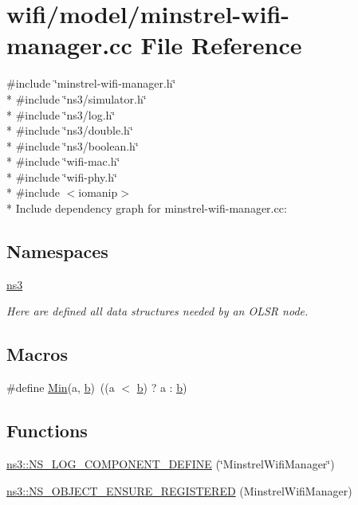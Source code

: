 \hypertarget{minstrel-wifi-manager_8cc}{}\section{wifi/model/minstrel-\/wifi-\/manager.cc File Reference}
\label{minstrel-wifi-manager_8cc}
{\ttfamily \#include \char`\"{}minstrel-\/wifi-\/manager.\+h\char`\"{}}\\*
{\ttfamily \#include \char`\"{}ns3/simulator.\+h\char`\"{}}\\*
{\ttfamily \#include \char`\"{}ns3/log.\+h\char`\"{}}\\*
{\ttfamily \#include \char`\"{}ns3/double.\+h\char`\"{}}\\*
{\ttfamily \#include \char`\"{}ns3/boolean.\+h\char`\"{}}\\*
{\ttfamily \#include \char`\"{}wifi-\/mac.\+h\char`\"{}}\\*
{\ttfamily \#include \char`\"{}wifi-\/phy.\+h\char`\"{}}\\*
{\ttfamily \#include $<$iomanip$>$}\\*
Include dependency graph for minstrel-\/wifi-\/manager.cc\+:
\subsection*{Namespaces}
\begin{DoxyCompactItemize}
\item 
 \hyperlink{namespacens3}{ns3}
\begin{DoxyCompactList}\small\item\em Here are defined all data structures needed by an O\+L\+SR node. \end{DoxyCompactList}\end{DoxyCompactItemize}
\subsection*{Macros}
\begin{DoxyCompactItemize}
\item 
\#define \hyperlink{minstrel-wifi-manager_8cc_a9e04209162ea72f9985338596262b657}{Min}(a,  \hyperlink{lte__pathloss_8m_a21ad0bd836b90d08f4cf640b4c298e7c}{b})~((a $<$ \hyperlink{lte__pathloss_8m_a21ad0bd836b90d08f4cf640b4c298e7c}{b}) ? a \+: \hyperlink{lte__pathloss_8m_a21ad0bd836b90d08f4cf640b4c298e7c}{b})
\end{DoxyCompactItemize}
\subsection*{Functions}
\begin{DoxyCompactItemize}
\item 
\hyperlink{namespacens3_aac29f4338f3a7e8ba14638205d233092}{ns3\+::\+N\+S\+\_\+\+L\+O\+G\+\_\+\+C\+O\+M\+P\+O\+N\+E\+N\+T\+\_\+\+D\+E\+F\+I\+NE} (\char`\"{}Minstrel\+Wifi\+Manager\char`\"{})
\item 
\hyperlink{namespacens3_a6837f0ff62aad7c4c2e0de9f2c4cf638}{ns3\+::\+N\+S\+\_\+\+O\+B\+J\+E\+C\+T\+\_\+\+E\+N\+S\+U\+R\+E\+\_\+\+R\+E\+G\+I\+S\+T\+E\+R\+ED} (Minstrel\+Wifi\+Manager)
\end{DoxyCompactItemize}



